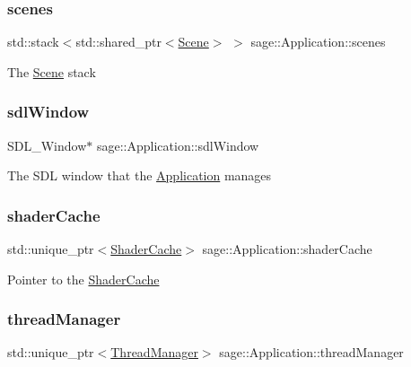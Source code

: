 \subsubsection{\texorpdfstring{scenes}{scenes}}
{\footnotesize\ttfamily std\+::stack$<$std\+::shared\+\_\+ptr$<$\mbox{\hyperlink{classsage_1_1Scene}{Scene}}$>$ $>$ sage\+::\+Application\+::scenes\hspace{0.3cm}{\ttfamily [private]}}

The \mbox{\hyperlink{classsage_1_1Scene}{Scene}} stack \mbox{\label{classsage_1_1Application_ab8d3166ecc1b2c3387da0633557f0d77}} 
\subsubsection{\texorpdfstring{sdlWindow}{sdlWindow}}
{\footnotesize\ttfamily S\+D\+L\+\_\+\+Window$\ast$ sage\+::\+Application\+::sdl\+Window\hspace{0.3cm}{\ttfamily [private]}}

The S\+DL window that the \mbox{\hyperlink{classsage_1_1Application}{Application}} manages \mbox{\label{classsage_1_1Application_a9a7bcc406dca9a460d54f11c2eda47c4}} 
\subsubsection{\texorpdfstring{shaderCache}{shaderCache}}
{\footnotesize\ttfamily std\+::unique\+\_\+ptr$<$\mbox{\hyperlink{classsage_1_1ShaderCache}{Shader\+Cache}}$>$ sage\+::\+Application\+::shader\+Cache\hspace{0.3cm}{\ttfamily [private]}}

Pointer to the \mbox{\hyperlink{classsage_1_1ShaderCache}{Shader\+Cache}} \mbox{\label{classsage_1_1Application_a32a666257ae6b2729ebaf2906abc13d4}} 
\subsubsection{\texorpdfstring{threadManager}{threadManager}}
{\footnotesize\ttfamily std\+::unique\+\_\+ptr$<$\mbox{\hyperlink{classsage_1_1ThreadManager}{Thread\+Manager}}$>$ sage\+::\+Application\+::thread\+Manager\hspace{0.3cm}{\ttfamily [private]}}

